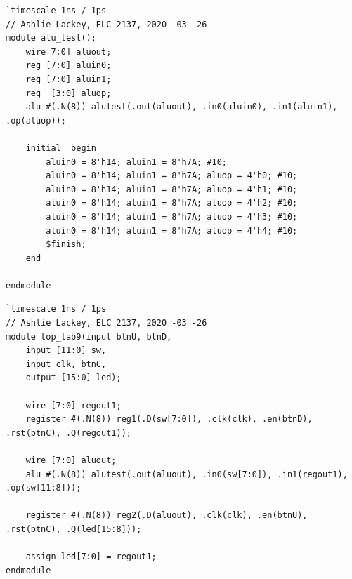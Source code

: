 \documentclass[11pt]{article}
\begin{document}
\begin{lstlisting}[style=Verilog,caption= ALU testbench Verilog Code,label=code:ex ]
`timescale 1ns / 1ps
// Ashlie Lackey, ELC 2137, 2020 -03 -26
module alu_test();
	wire[7:0] aluout;
	reg [7:0] aluin0;
	reg [7:0] aluin1; 
	reg  [3:0] aluop;
	alu #(.N(8)) alutest(.out(aluout), .in0(aluin0), .in1(aluin1), .op(aluop));
	
	initial  begin
		aluin0 = 8'h14; aluin1 = 8'h7A; #10;
		aluin0 = 8'h14; aluin1 = 8'h7A; aluop = 4'h0; #10;
		aluin0 = 8'h14; aluin1 = 8'h7A; aluop = 4'h1; #10;
		aluin0 = 8'h14; aluin1 = 8'h7A; aluop = 4'h2; #10;
		aluin0 = 8'h14; aluin1 = 8'h7A; aluop = 4'h3; #10;
		aluin0 = 8'h14; aluin1 = 8'h7A; aluop = 4'h4; #10; 
		$finish;
	end

endmodule
\end{lstlisting}

\begin{lstlisting}[style=Verilog,caption= top-lab9 Verilog Code,label=code:ex ]
`timescale 1ns / 1ps
// Ashlie Lackey, ELC 2137, 2020 -03 -26
module top_lab9(input btnU, btnD,
	input [11:0] sw,
	input clk, btnC,
	output [15:0] led);
	
	wire [7:0] regout1;
	register #(.N(8)) reg1(.D(sw[7:0]), .clk(clk), .en(btnD), .rst(btnC), .Q(regout1));
	
	wire [7:0] aluout;
	alu #(.N(8)) alutest(.out(aluout), .in0(sw[7:0]), .in1(regout1), .op(sw[11:8]));
	
	register #(.N(8)) reg2(.D(aluout), .clk(clk), .en(btnU), .rst(btnC), .Q(led[15:8]));
	
	assign led[7:0] = regout1;
endmodule
\end{lstlisting}
\end{document}
